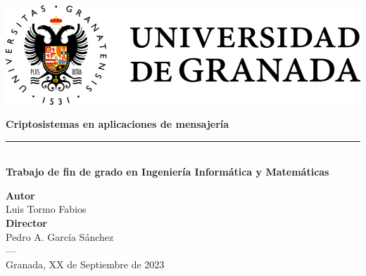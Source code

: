 \begin{titlepage}
 
 
\setlength{\centeroffset}{-0.5\oddsidemargin}
\addtolength{\centeroffset}{0.5\evensidemargin}
\thispagestyle{empty}

\noindent\hspace*{\centeroffset}\begin{minipage}{\textwidth}

\centering

 \vspace{3.3cm}

\includegraphics{imagenes/logo.png} 
 \vspace{0.5cm}


{\Huge\bfseries Criptosistemas en aplicaciones de mensajería\\
}
\noindent\rule[-1ex]{\textwidth}{3pt}\\[3.5ex]
{\large\bfseries Trabajo de fin de grado en Ingeniería Informática y Matemáticas\\[4cm]}
\end{minipage}

\vspace{2.5cm}
\noindent\hspace*{\centeroffset}\begin{minipage}{\textwidth}
\centering

\textbf{Autor}\\ {Luis Tormo Fabios}\\[2.5ex]
\textbf{Director}\\
Pedro A. García Sánchez\\
\textsc{---}\\
Granada, XX de Septiembre de 2023
\end{minipage}


 
\end{titlepage}


